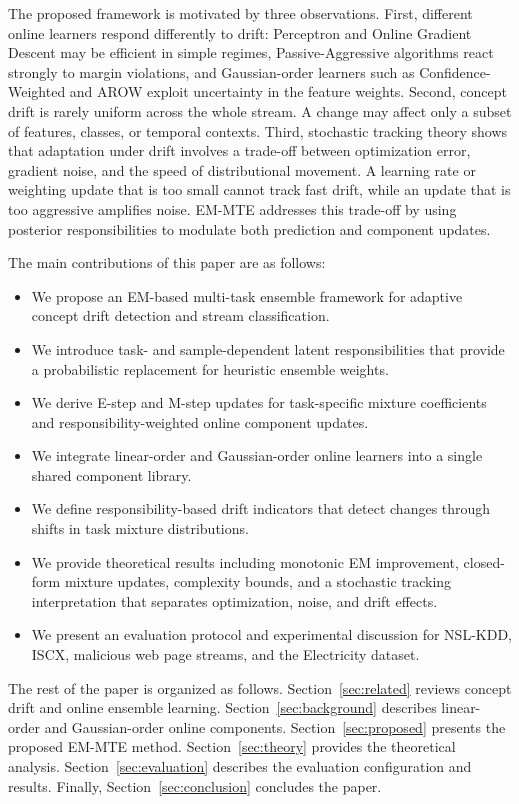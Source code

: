 ﻿\documentclass[12pt,a4paper]{article}
\begin{document}
The proposed framework is motivated by three observations. First, different online learners respond differently to drift: Perceptron and Online Gradient Descent may be efficient in simple regimes, Passive-Aggressive algorithms react strongly to margin violations, and Gaussian-order learners such as Confidence-Weighted and AROW exploit uncertainty in the feature weights. Second, concept drift is rarely uniform across the whole stream. A change may affect only a subset of features, classes, or temporal contexts. Third, stochastic tracking theory shows that adaptation under drift involves a trade-off between optimization error, gradient noise, and the speed of distributional movement. A learning rate or weighting update that is too small cannot track fast drift, while an update that is too aggressive amplifies noise. EM-MTE addresses this trade-off by using posterior responsibilities to modulate both prediction and component updates.

The main contributions of this paper are as follows:
\begin{itemize}
  \item We propose an EM-based multi-task ensemble framework for adaptive concept drift detection and stream classification.
  \item We introduce task- and sample-dependent latent responsibilities that provide a probabilistic replacement for heuristic ensemble weights.
  \item We derive E-step and M-step updates for task-specific mixture coefficients and responsibility-weighted online component updates.
  \item We integrate linear-order and Gaussian-order online learners into a single shared component library.
  \item We define responsibility-based drift indicators that detect changes through shifts in task mixture distributions.
  \item We provide theoretical results including monotonic EM improvement, closed-form mixture updates, complexity bounds, and a stochastic tracking interpretation that separates optimization, noise, and drift effects.
  \item We present an evaluation protocol and experimental discussion for NSL-KDD, ISCX, malicious web page streams, and the Electricity dataset.
\end{itemize}

The rest of the paper is organized as follows. Section~\ref{sec:related} reviews concept drift and online ensemble learning. Section~\ref{sec:background} describes linear-order and Gaussian-order online components. Section~\ref{sec:proposed} presents the proposed EM-MTE method. Section~\ref{sec:theory} provides the theoretical analysis. Section~\ref{sec:evaluation} describes the evaluation configuration and results. Finally, Section~\ref{sec:conclusion} concludes the paper.
\end{document}
